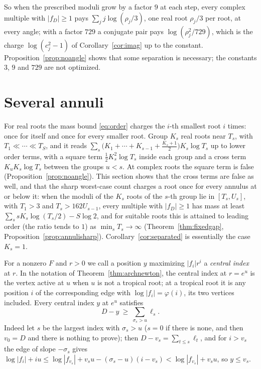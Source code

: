 \documentclass[11pt]{article}
\begin{document}
So when the prescribed moduli grow by a factor $9$ at each step, every
complex multiple with $|f_D|\ge1$ pays $\sum_jj\log(\rho_j/3)$, one real root $\rho_j/3$ per
root, at every angle; with a factor $729$ a conjugate pair pays
$\log(\rho_j^2/729)$, which is the charge $\log(c_j^2-1)$ of
Corollary~\ref{cor:imag} up to the constant.  Proposition~\ref{prop:noangle}
shows that some separation is necessary; the constants $3$, $9$ and $729$ are
not optimized.

\section{Several annuli}\label{sec:annuli}

For real roots the mass bound \eqref{eq:order} charges the $i$-th smallest
root $i$ times: once for itself and once for every smaller root.  Group $K_s$
real roots near $T_s$, with $T_1\ll\cdots\ll T_S$, and it reads
$\sum_s\bigl(K_1+\cdots+K_{s-1}+\frac{K_s+1}2\bigr)K_s\log T_s$ up to lower
order terms, with a square term $\frac12K_s^2\log T_s$ inside each group and a
cross term $K_uK_s\log T_s$ between the groups $u<s$.  At complex roots the
square term is false (Proposition~\ref{prop:noangle}).  This section shows
that the cross terms are false as well, and that the sharp worst-case count charges a
root once for every annulus at or below it: when the moduli of the $K_s$ roots
of the $s$-th group lie in $[T_s,U_s]$, with $T_1>3$ and $T_s>162U_{s-1}$, every multiple with $|f_D|\ge1$ has mass at least
$\sum_ssK_s\log(T_s/2)-S\log2$, and for suitable roots this is
attained to leading order (the ratio tends to $1$) as $\min_sT_s\to\infty$
(Theorem~\ref{thm:fixedgap}, Proposition~\ref{prop:annulisharp}).
Corollary~\ref{cor:separated} is essentially the case $K_s=1$.

For a nonzero $F$ and $r>0$ we call a position $y$ maximizing $|f_i|r^i$ a
\emph{central index} at $r$.  In the notation of Theorem~\ref{thm:archnewton},
the central index at $r=e^u$ is the vertex active at $u$ when $u$ is not a
tropical root; at a tropical root it is any position $i$ of the corresponding
edge with $\log|f_i|=\varphi(i)$, its two vertices included.  Every central
index $y$ at $e^u$ satisfies
\begin{equation}\label{eq:centralabove}
  D-y\ \ge\ \sum_{\sigma_s>u}\ell_s .
\end{equation}
Indeed let $s$ be the largest index with
$\sigma_s>u$ ($s=0$ if there is none, and then $v_0=D$ and there is nothing
to prove); then $D-v_s=\sum_{t\le s}\ell_t$, and for $i>v_s$ the edge of
slope $-\sigma_s$ gives
$\log|f_i|+iu\le\log|f_{v_s}|+v_su-(\sigma_s-u)(i-v_s)<\log|f_{v_s}|+v_su$,
so $y\le v_s$.
\end{document}
